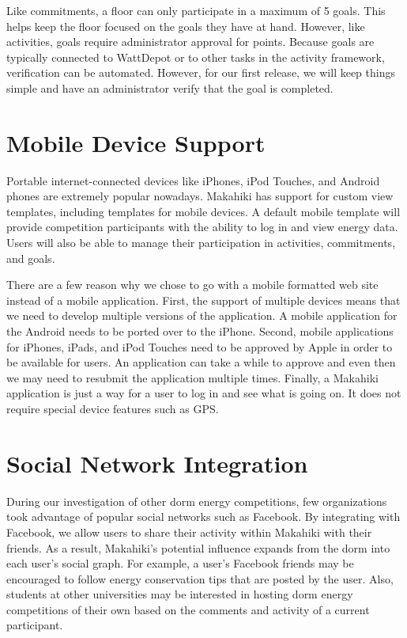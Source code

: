 Like commitments, a floor can only participate in a maximum of 5 goals.  This helps keep the floor focused on the goals they have at hand.  However, like activities, goals require administrator approval for points.  Because goals are typically connected to WattDepot or to other tasks in the activity framework, verification can be automated.  However, for our first release, we will keep things simple and have an administrator verify that the goal is completed.

\section{Mobile Device Support}
\label{mobile}

Portable internet-connected devices like iPhones, iPod Touches, and Android phones are extremely popular nowadays.  Makahiki has support for custom view templates, including templates for mobile devices.  A default mobile template will provide competition participants with the ability to log in and view energy data.  Users will also be able to manage their participation in activities, commitments, and goals.

There are a few reason why we chose to go with a mobile formatted web site instead of a mobile application.  First, the support of multiple devices means that we need to develop multiple versions of the application.  A mobile application for the Android needs to be ported over to the iPhone. Second, mobile applications for iPhones, iPads, and iPod Touches need to be approved by Apple in order to be available for users.  An application can take a while to approve and even then we may need to resubmit the application multiple times.  Finally, a Makahiki application is just a way for a user to log in and see what is going on.  It does not require special device features such as GPS.

\section{Social Network Integration}
\label{socialint}

During our investigation of other dorm energy competitions, few organizations took advantage of popular social networks such as Facebook.  By integrating with Facebook, we allow users to share their activity within Makahiki with their friends.  As a result, Makahiki's potential influence expands from the dorm into each user's social graph.  For example, a user's Facebook friends may be encouraged to follow energy conservation tips that are posted by the user.  Also, students at other universities may be interested in hosting dorm energy competitions of their own based on the comments and activity of a current participant.

